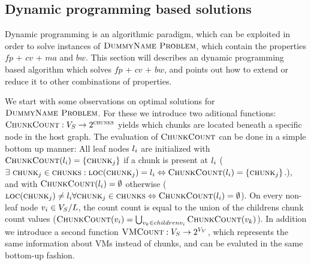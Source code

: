 \subsection{Dynamic programming based solutions}

Dynamic programming is an algorithmic paradigm, which can be exploited in 
order to solve instances of $\textsc{DummyName Problem}$, which contain the properties $fp$ + 
$cv$ + $ma$ and $bw$. This section will describes an dynamic programming based 
algorithm which solves $fp$ + $cv$ + $bw$, and points out how to extend or 
reduce it to other combinations of properties.




\newcommand{\Opt}{\ensuremath{Opt}}
\newcommand{\Children}{\ensuremath{children}}

\newcommand{\Uplink}{\ensuremath{\textsc{uplink}}}
\newcommand{\ChunkCount}{\ensuremath{\textsc{ChunkCount}}}
\newcommand{\VmCount}{\ensuremath{\textsc{VMCount}}}
\newcommand{\Right}{\ensuremath{r}}
\newcommand{\InverseAssignment}{\ensuremath{\VmChunkAssignment^{-1}}}


We start with some observations on optimal solutions for $\textsc{DummyName Problem}$. For these 
we introduce two aditional functions: $\ChunkCount : \SubstrateNodes 
\rightarrow 
2^\Chunks$ yields which chunks are located beneath a specific node in 
the host graph. The evaluation of $\ChunkCount$ can be done in a simple bottom 
up manner: All leaf nodes $l_i$ are initialized with $\ChunkCount(\Leaf_i) 
= \{\Chunk_j\}$ if a chunk is present at $l_i$ ($\exists ~ \Chunk_j \in 
\Chunks : \ChunkLocation(\Chunk_j) = \Leaf_i \Leftrightarrow 
\ChunkCount(\Leaf_i) = \{\Chunk_j\}$.), and with $\ChunkCount(\Leaf_i) = 
\emptyset$ otherwise ($\ChunkLocation(\Chunk_j) \neq \Leaf_i \forall \Chunk_j 
\in 
\Chunks \Leftrightarrow \ChunkCount(\Leaf_i) = \emptyset$). On every non-leaf 
node $v_i \in V_S / L$, the count count is equal 
to the union of the childrens chunk count values 
($\ChunkCount(\SubstrateNode_i) 
= \bigcup_{\SubstrateNode_k \in \Children{\SubstrateNode_i}} 
\ChunkCount(\SubstrateNode_k)$). In addition we introduce a second function 
$\VmCount : \SubstrateNodes \rightarrow 2^{\VirtualNodes}$, which represents 
the same information about VMs instead of chunks, and can be evaluted in the 
same bottom-up fashion.

